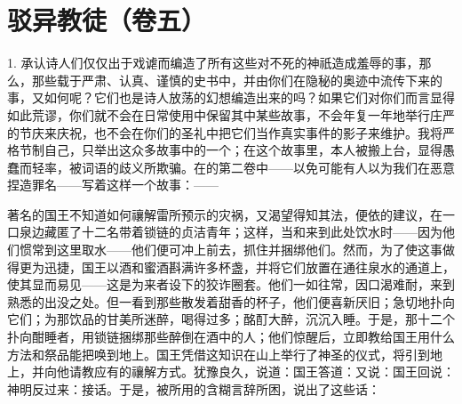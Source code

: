 
\section{驳异教徒（卷五）}

1. 承认诗人们仅仅出于戏谑而编造了所有这些对不死的神祇造成羞辱的事，那么，那些载于严肃、认真、谨慎的史书中，并由你们在隐秘的奥迹中流传下来的事，又如何呢？它们也是诗人放荡的幻想编造出来的吗？如果它们对你们而言显得如此荒谬，你们就不会在日常使用中保留其中某些故事，不会年复一年地举行庄严的节庆来庆祝，也不会在你们的圣礼中把它们当作真实事件的影子来维护。我将严格节制自己，只举出这众多故事中的一个；在这个故事里，本人被搬上台，显得愚蠢而轻率，被词语的歧义所欺骗。在的第二卷中——以免可能有人以为我们在恶意捏造罪名——写着这样一个故事：——\par

著名的国王不知道如何禳解雷所预示的灾祸，又渴望得知其法，便依的建议，在一口泉边藏匿了十二名带着锁链的贞洁青年；这样，当和来到此处饮水时——因为他们惯常到这里取水——他们便可冲上前去，抓住并捆绑他们。然而，为了使这事做得更为迅捷，国王以酒和蜜酒斟满许多杯盏，并将它们放置在通往泉水的通道上，使其显而易见——这是为来者设下的狡诈圈套。他们一如往常，因口渴难耐，来到熟悉的出没之处。但一看到那些散发着甜香的杯子，他们便喜新厌旧；急切地扑向它们；为那饮品的甘美所迷醉，喝得过多；酩酊大醉，沉沉入睡。于是，那十二个扑向酣睡者，用锁链捆绑那些醉倒在酒中的人；他们惊醒后，立即教给国王用什么方法和祭品能把唤到地上。国王凭借这知识在山上举行了神圣的仪式，将引到地上，并向他请教应有的禳解方式。犹豫良久，说道：国王答道：又说：国王回说：神明反过来：接话。于是，被所用的含糊言辞所困，说出了这些话：\par

